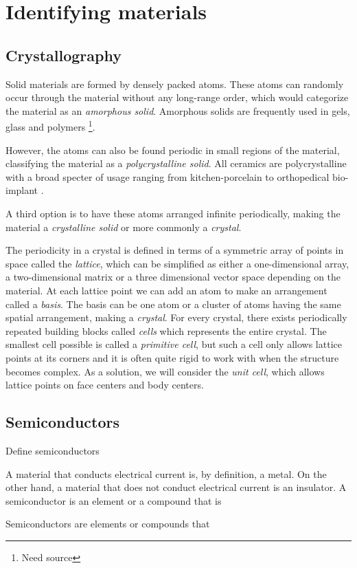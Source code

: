 \chapter{Identifying materials}
\section{Crystallography}

Solid materials are formed by densely packed atoms. These atoms can randomly occur through the material without any long-range order, which would categorize the material as an \textit{amorphous solid}. Amorphous solids are frequently used in gels, glass and polymers \footnote{Need source}.

However, the atoms can also be found periodic in small regions of the material, classifying the material as a \textit{polycrystalline solid}. All ceramics are polycrystalline with a broad specter of usage ranging from kitchen-porcelain to orthopedical bio-implant \cite{Renganathan2018}.

A third option is to have these atoms arranged infinite periodically, making the material a \textit{crystalline solid} or more commonly a \textit{crystal}.

The periodicity in a crystal is defined in terms of a symmetric array of points in space called the \textit{lattice}, which can be simplified as either a one-dimensional array, a two-dimensional matrix or a three dimensional vector space depending on the material. At each lattice point we can add an atom to make an arrangement called a \textit{basis}. The basis can be one atom or a cluster of atoms having the same spatial arrangement, making a \textit{crystal}. For every crystal, there exists periodically repeated building blocks called \textit{cells} which represents the entire crystal. The smallest cell possible is called a \textit{primitive cell}, but such a cell only allows lattice points at its corners and it is often quite rigid to work with when the structure becomes complex. As a solution, we will consider the \textit{unit cell}, which allows lattice points on face centers and body centers.


\section{Semiconductors}

Define semiconductors

A material that conducts electrical current is, by definition, a metal. On the other hand, a material that does not conduct electrical current is an insulator. A semiconductor is an element or a compound that is

Semiconductors are elements or compounds that
